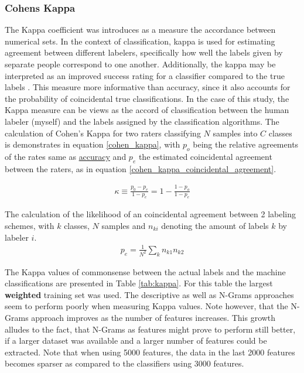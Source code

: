 		\subsubsection{Cohens Kappa}
			The Kappa coefficient was introduces as \cite{cohen1960coefficient} a measure the accordance between numerical sets. In the context of classification, kappa is used for estimating agreement between different labelers, specifically how well the labels given by separate people correspond to one another. Additionally, the kappa may be interpreted as an improved success rating for a classifier compared to the true labels \cite{castillo2011information}. This measure more informative than accuracy, since it also accounts for the probability of coincidental true classifications. In the case of this study, the Kappa measure can be views as the accord of classification between the human labeler (myself) and the labels assigned by the classification algorithms. The calculation of Cohen's Kappa for two raters classifying $ N $ samples into $ C $ classes is demonstrates in equation \ref{cohen_kappa}, with $ p_o $ being the relative agreements of the rates same as \hyperref[accuracy]{accuracy} and $ p_e $ the estimated coincidental agreement between the raters, as in equation \ref{cohen_kappa_coincidental_agreement}. 
			
			\begin{equation}
				\begin{aligned}
					\kappa \equiv \frac{p_0-p_e}{1-p_e} = 1 - \frac{1-p_o}{1-p_e}
				\end{aligned}
				\label{cohen_kappa}
			\end{equation}
		
		The calculation of the likelihood of an coincidental agreement between 2 labeling schemes, with $ k $ classes, $ N $ samples and $ n_{ki} $ denoting the amount of labels $ k $ by labeler $ i $.
			\begin{equation}
				\begin{aligned}
					p_e = \frac{1}{N^2}\sum_k n_{k1}n_{k2}
				\end{aligned}
				\label{cohen_kappa_coincidental_agreement}
			\end{equation}
			
		The Kappa values of commonsense between the actual labels and the machine classifications are presented in Table \ref{tab:kappa}. For this table the largest \textbf{weighted} training set was used. The descriptive as well as N-Grams approaches seem to perform poorly when measuring Kappa values. Note however, that the N-Grams approach improves as the number of features increases. This growth alludes to the fact, that N-Grams as features might prove to perform still better, if a larger dataset was available and a larger number of features could be extracted. Note that when using 5000 features, the data in the last 2000 features becomes sparser as compared to the classifiers using 3000 features.
		
